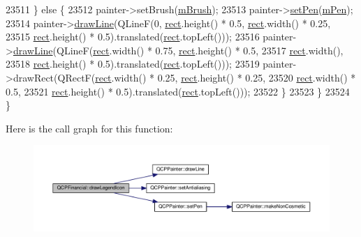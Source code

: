 \begin{DoxyCode}
23511     \} \textcolor{keywordflow}{else} \{
23512       painter->setBrush(\hyperlink{class_q_c_p_abstract_plottable_a33f00674c0161c13315ab9da0895418e}{mBrush});
23513       painter->\hyperlink{class_q_c_p_painter_af9c7a4cd1791403901f8c5b82a150195}{setPen}(\hyperlink{class_q_c_p_abstract_plottable_a67bc0622fd1b9fa14e54c14922dcec66}{mPen});
23514       painter->\hyperlink{class_q_c_p_painter_a0b4b1b9bd495e182c731774dc800e6e0}{drawLine}(QLineF(0, \hyperlink{_gen_blob_8m_aea8f6815d9a63491fc422c5572c6b3c3}{rect}.height() * 0.5, \hyperlink{_gen_blob_8m_aea8f6815d9a63491fc422c5572c6b3c3}{rect}.width() * 0.25,
23515                                \hyperlink{_gen_blob_8m_aea8f6815d9a63491fc422c5572c6b3c3}{rect}.height() * 0.5).translated(\hyperlink{_gen_blob_8m_aea8f6815d9a63491fc422c5572c6b3c3}{rect}.topLeft()));
23516       painter->\hyperlink{class_q_c_p_painter_a0b4b1b9bd495e182c731774dc800e6e0}{drawLine}(QLineF(\hyperlink{_gen_blob_8m_aea8f6815d9a63491fc422c5572c6b3c3}{rect}.width() * 0.75, \hyperlink{_gen_blob_8m_aea8f6815d9a63491fc422c5572c6b3c3}{rect}.height() * 0.5,
23517                                \hyperlink{_gen_blob_8m_aea8f6815d9a63491fc422c5572c6b3c3}{rect}.width(),
23518                                \hyperlink{_gen_blob_8m_aea8f6815d9a63491fc422c5572c6b3c3}{rect}.height() * 0.5).translated(\hyperlink{_gen_blob_8m_aea8f6815d9a63491fc422c5572c6b3c3}{rect}.topLeft()));
23519       painter->drawRect(QRectF(\hyperlink{_gen_blob_8m_aea8f6815d9a63491fc422c5572c6b3c3}{rect}.width() * 0.25, \hyperlink{_gen_blob_8m_aea8f6815d9a63491fc422c5572c6b3c3}{rect}.height() * 0.25,
23520                                \hyperlink{_gen_blob_8m_aea8f6815d9a63491fc422c5572c6b3c3}{rect}.width() * 0.5,
23521                                \hyperlink{_gen_blob_8m_aea8f6815d9a63491fc422c5572c6b3c3}{rect}.height() * 0.5).translated(\hyperlink{_gen_blob_8m_aea8f6815d9a63491fc422c5572c6b3c3}{rect}.topLeft()));
23522     \}
23523   \}
23524 \}
\end{DoxyCode}


Here is the call graph for this function\+:\nopagebreak
\begin{figure}[H]
\begin{center}
\leavevmode
\includegraphics[width=350pt]{class_q_c_p_financial_aca85e8435b092cc8c3e5de65fcfb22c8_cgraph}
\end{center}
\end{figure}


